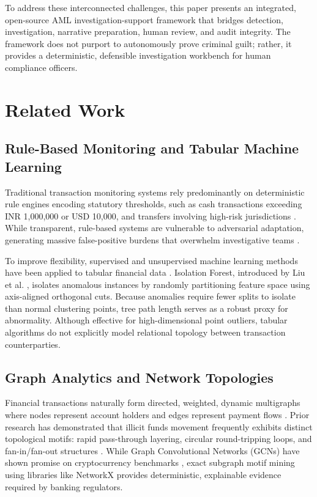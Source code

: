 \documentclass[10pt,journal,compsoc]{IEEEtran}
\begin{document}
To address these interconnected challenges, this paper presents an integrated, open-source AML investigation-support framework that bridges detection, investigation, narrative preparation, human review, and audit integrity. The framework does not purport to autonomously prove criminal guilt; rather, it provides a deterministic, defensible investigation workbench for human compliance officers.

\section{Related Work}
\subsection{Rule-Based Monitoring and Tabular Machine Learning}
Traditional transaction monitoring systems rely predominantly on deterministic rule engines encoding statutory thresholds, such as cash transactions exceeding INR 1,000,000 or USD 10,000, and transfers involving high-risk jurisdictions \cite{fatf2012guidance, rbi2016kyc}. While transparent, rule-based systems are vulnerable to adversarial adaptation, generating massive false-positive burdens that overwhelm investigative teams \cite{chen2023machine}.

To improve flexibility, supervised and unsupervised machine learning methods have been applied to tabular financial data \cite{chandola2009anomaly}. Isolation Forest, introduced by Liu et al. \cite{liu2008isolation, liu2012isolation}, isolates anomalous instances by randomly partitioning feature space using axis-aligned orthogonal cuts. Because anomalies require fewer splits to isolate than normal clustering points, tree path length serves as a robust proxy for abnormality. Although effective for high-dimensional point outliers, tabular algorithms do not explicitly model relational topology between transaction counterparties.

\subsection{Graph Analytics and Network Topologies}
Financial transactions naturally form directed, weighted, dynamic multigraphs where nodes represent account holders and edges represent payment flows \cite{weber2019anti}. Prior research has demonstrated that illicit funds movement frequently exhibits distinct topological motifs: rapid pass-through layering, circular round-tripping loops, and fan-in/fan-out structures \cite{jullum2020detecting}. While Graph Convolutional Networks (GCNs) have shown promise on cryptocurrency benchmarks \cite{weber2019anti}, exact subgraph motif mining using libraries like NetworkX \cite{hagberg2008exploring} provides deterministic, explainable evidence required by banking regulators.
\end{document}
